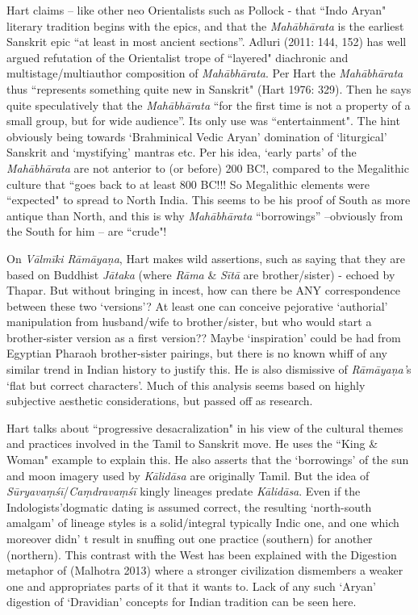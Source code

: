 Hart claims – like other neo Orientalists such as Pollock - that “Indo Aryan" literary tradition begins with the epics, and that the \textit{Mahābhārata} is the earliest Sanskrit epic “at least in most ancient sections”. Adluri (2011: 144, 152) has well argued refutation of the Orientalist trope of “layered" diachronic and multistage/multiauthor composition of \textit{Mahābhārata}. Per Hart the \textit{Mahābhārata} thus “represents something quite new in Sanskrit" (Hart 1976: 329). Then he says quite speculatively that the \textit{Mahābhārata } “for the first time is not a property of a small group, but for wide audience”. Its only use was “entertainment". The hint obviously being towards ‘Brahminical Vedic Aryan’ domination of ‘liturgical’ Sanskrit and ‘mystifying’ mantras etc. Per his idea, ‘early parts’ of the \textit{Mahābhārata } are not anterior to (or before) 200 BC!, compared to the Megalithic culture that “goes back to at least 800 BC!!! So Megalithic elements were “expected" to spread to North India. This seems to be his proof of South as more antique than North, and this is why \textit{Mahābhārata } “borrowings” –obviously from the South for him – are “crude"!

On \textit{Vālmīki Rāmāyaṇa}, Hart makes wild assertions, such as saying that they are based on Buddhist \textit{Jātaka } (where \textit{Rāma} \& \textit{Sītā } are brother/sister) - echoed by Thapar. But without bringing in incest, how can there be ANY correspondence between these two ‘versions’? At least one can conceive pejorative ‘authorial’ manipulation from husband/wife to brother/sister, but who would start a brother-sister version as a first version?? Maybe ‘inspiration’ could be had from Egyptian Pharaoh brother-sister pairings, but there is no known whiff of any similar trend in Indian history to justify this. He is also dismissive of \textit{Rāmāyaṇa’}s ‘flat but correct characters’. Much of this analysis seems based on highly subjective aesthetic considerations, but passed off as research.

Hart talks about “progressive desacralization" in his view of the cultural themes and practices involved in the Tamil to Sanskrit move. He uses the “King \& Woman" example to explain this. He also asserts that the ‘borrowings’ of the sun and moon imagery used by \textit{Kālidāsa} are originally Tamil. But the idea of \textit{Sūryavaṃśī}/\textit{Caṃdravaṃśī} kingly lineages predate \textit{Kālidāsa}. Even if the Indologists’dogmatic dating is assumed correct, the resulting ‘north-south amalgam’ of lineage styles is a solid/integral typically Indic one, and one which moreover didn’ t result in snuffing out one practice (southern) for another (northern). This contrast with the West has been explained with the Digestion metaphor of (Malhotra 2013) where a stronger civilization dismembers a weaker one and appropriates parts of it that it wants to. Lack of any such ‘Aryan’ digestion of ‘Dravidian’ concepts for Indian tradition can be seen here.


